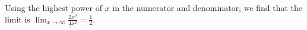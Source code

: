 Using the highest power of $x$ in the numerator and denominator, we find that the limit is $\lim_{x \to \infty} \frac{2x^2}{4x^2} = \frac{1}{2}$.
